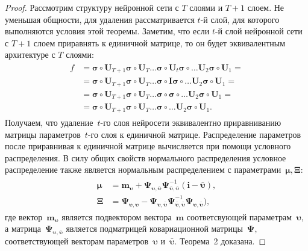 \documentclass[12pt]{a&t}
\begin{document}
\begin{proof}
Рассмотрим структуру нейронной сети с $T$ слоями и $T+1$ слоем. Не уменьшая общности, для удаления рассматривается $t$-й слой, для которого выполняются условия этой теоремы. Заметим, что если $t$-й слой нейронной сети с $T+1$ слоем приравнять к единичной матрице, то он будет эквивалентным архитектуре с $T$ слоями:
\begin{gather}
\label{eq:ap:tr:2:1}
\begin{aligned}
f &= \bm{\sigma} \circ \mathbf{U}_{T+1}\bm{\sigma} \circ \mathbf{U}_T \ldots \bm{\sigma} \circ \mathbf{U}_t\bm{\sigma} \circ \ldots  \mathbf{U}_2\bm{\sigma} \circ \mathbf{U}_1 =\\
&=  \bm{\sigma} \circ \mathbf{U}_{T+1}\bm{\sigma} \circ \mathbf{U}_T \ldots \bm{\sigma} \circ \mathbf{I}\bm{\sigma} \circ \ldots  \mathbf{U}_2\bm{\sigma} \circ \mathbf{U}_1 =\\
&=  \bm{\sigma} \circ \mathbf{U}_{T+1}\bm{\sigma} \circ \mathbf{U}_T \ldots \bm{\sigma} \circ \bm{\sigma} \circ \ldots  \mathbf{U}_2\bm{\sigma} \circ \mathbf{U}_1 =\\
&=  \bm{\sigma} \circ \mathbf{U}_{T+1}\bm{\sigma} \circ \mathbf{U}_T \ldots \bm{\sigma} \circ \ldots  \mathbf{U}_2\bm{\sigma} \circ \mathbf{U}_1.
\end{aligned}
\end{gather}
Получаем, что удаление~$t$-го слоя нейросети эквивалентно приравниванию матрицы параметров~$t$-го слоя к единичной матрице. Распределение параметров после приравнивая к единичной матрице вычисляется при помощи условного распределения. В силу общих свойств нормального распределения условное распределение также является нормальным распределением с параметрами~$\bm{\mu}, \bm{\Xi}:$
\begin{gather}
\label{eq:ap:tr:2:2}
\begin{aligned}
\bm{\mu} &= \mathbf{m}_{\bm{\upsilon}}+\bm{\Psi}_{\bm{\upsilon},\bar{\bm{\upsilon}}} \bm{\Psi}_{\bar{\bm{\upsilon}},\bar{\bm{\upsilon}}}^{-1} \left(\mathbf{i} - \bar{\bm{\upsilon}}\right), \\
\bm{\Xi} &= \bm{\Psi}_{\bm{\upsilon},\bm{\upsilon}} - \bm{\Psi}_{\bm{\upsilon},\bar{\bm{\upsilon}}}\bm{\Psi}_{\bar{\bm{\upsilon}},\bar{\bm{\upsilon}}}^{-1}\bm{\Psi}_{\bm{\upsilon},\bar{\bm{\upsilon}}}\bigr),
\end{aligned}
\end{gather}
где вектор~$\mathbf{m}_{\bm{\upsilon}}$ является подвектором вектора~$\mathbf{m}$ соответсвующей параметрам~$\bm{\upsilon},$ а матрица~$\bm{\Psi}_{\bm{\upsilon},\bar{\bm{\upsilon}}}$ является подматрицей ковариационной матрицы~$\bm{\Psi},$ соответствующей векторам параметров~$\bm{\upsilon}$ и~$\bar{\bm{\upsilon}}.$ Теорема~2 доказана.
\end{proof}
\end{document}

